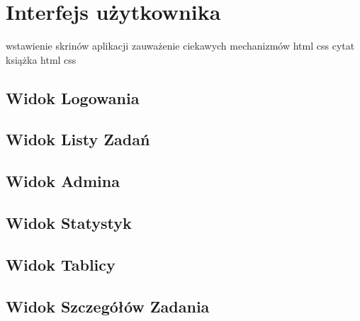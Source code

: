 \chapter{Interfejs użytkownika}
wstawienie skrinów aplikacji zauważenie ciekawych mechanizmów html css cytat książka html css
\section{Widok Logowania}
\section{Widok Listy Zadań}
\section{Widok Admina}
\section{Widok Statystyk}
\section{Widok Tablicy}
\section{Widok Szczegółów Zadania}